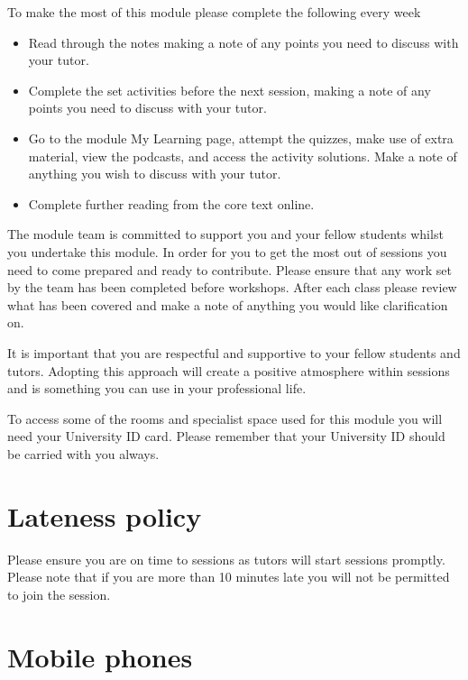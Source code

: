 \documentclass{MDXHandbook}
\begin{document}
To make the most of this module please complete the following every week
\begin{itemize}
\item Read through the notes making a note of any points you need to discuss with your tutor.
\item Complete the set activities before the next session, making a note of any points you need to discuss with your tutor.
\item Go to the module My Learning page, attempt the quizzes, make use of extra material, view the podcasts, and access the activity solutions. Make a note of anything you wish to discuss with your tutor.
\item Complete further reading from the core text online.
\end{itemize}
The module team is committed to support you and your fellow students whilst you undertake this module. In order for you to get the most out of sessions you need to come prepared and ready to contribute. Please ensure that any work set by the team has been completed before workshops. After each class please review what has been covered and make a note of anything you would like clarification on. 

It is important that you are respectful and supportive to your fellow students and tutors. Adopting this approach will create a positive atmosphere within sessions and is something you can use in your professional life. 

To access some of the rooms and specialist space used for this module you will need your University ID card. Please remember that your University ID should be carried with you always.

\section*{Lateness policy}

Please ensure you are on time to sessions as tutors will start sessions promptly.  Please note that if you are more than 10 minutes late you will not be permitted to join the session. 



\section*{Mobile phones}
\end{document}

